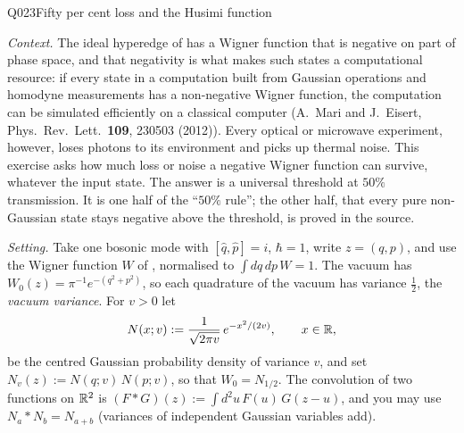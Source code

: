 \begin{entry}{Q023}{Fifty per cent loss and the Husimi function}


\begin{problem}
\emph{Context.} The ideal hyperedge of  has a Wigner function that is
negative on part of phase space, and that negativity is what makes such states a
computational resource: if every state in a computation built from Gaussian operations
and homodyne measurements has a non-negative Wigner function, the computation can be
simulated efficiently on a classical computer (A.~Mari and J.~Eisert, Phys.~Rev.~Lett.\
\textbf{109}, 230503 (2012)). Every optical or microwave experiment, however, loses
photons to its environment and picks up thermal noise. This exercise asks how much loss
or noise a negative Wigner function can survive, whatever the input state. The answer
is a universal threshold at $50\%$ transmission. It is one half of the ``$50\%$ rule'';
the other half, that every pure non-Gaussian state stays negative above the threshold,
is proved in the source.

\emph{Setting.} Take one bosonic mode with $[\hat q,\hat p]=i$, $\hbar=1$, write
$z=(q,p)$, and use the Wigner function $W$ of \qref{Q021}, normalised to
$\int dq\,dp\,W=1$. The vacuum has $W_{0}(z)=\pi^{-1}e^{-(q^2+p^2)}$, so each quadrature of
the vacuum has variance $\tfrac12$, the \emph{vacuum variance}. For $v>0$ let
\begin{equation}
  N(x;v):=\frac{1}{\sqrt{2\pi v}}\,e^{-x^{2}/(2v)},\qquad x\in\mathbb{R},
  \label{q023:gaussian}
\end{equation}
be the centred Gaussian probability density of variance $v$, and set
$N_v(z):=N(q;v)\,N(p;v)$, so that $W_0=N_{1/2}$.
The convolution of two functions on $\mathbb{R}^2$ is $(F*G)(z):=\int d^2u\,F(u)\,G(z-u)$, and you
may use $N_a*N_b=N_{a+b}$ (variances of independent Gaussian variables add).


\end{problem}
\end{entry}
